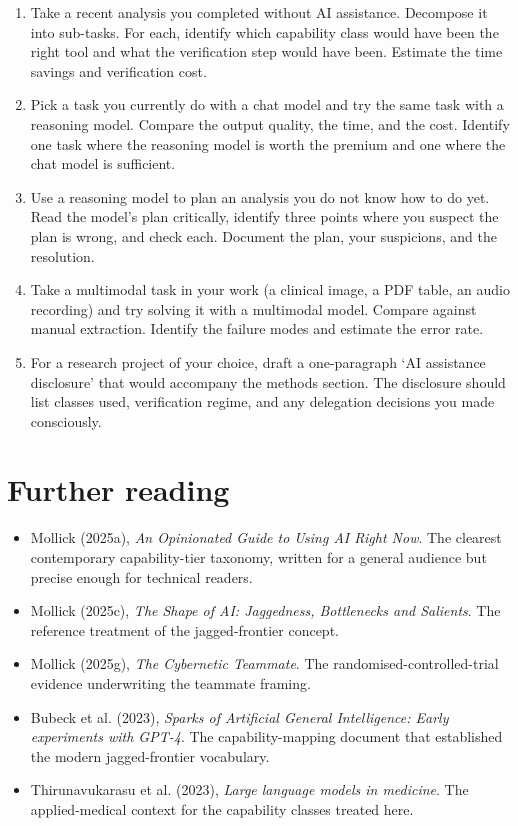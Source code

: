 \documentclass[
  letterpaper,
  11pt]{scrbook}
\providecommand{\tightlist}{%
  \setlength{\itemsep}{0pt}\setlength{\parskip}{0pt}}
\begin{document}
\begin{enumerate}
\def\labelenumi{\arabic{enumi}.}
\item
  Take a recent analysis you completed without AI assistance. Decompose
  it into sub-tasks. For each, identify which capability class would
  have been the right tool and what the verification step would have
  been. Estimate the time savings and verification cost.
\item
  Pick a task you currently do with a chat model and try the same task
  with a reasoning model. Compare the output quality, the time, and the
  cost. Identify one task where the reasoning model is worth the premium
  and one where the chat model is sufficient.
\item
  Use a reasoning model to plan an analysis you do not know how to do
  yet. Read the model's plan critically, identify three points where you
  suspect the plan is wrong, and check each. Document the plan, your
  suspicions, and the resolution.
\item
  Take a multimodal task in your work (a clinical image, a PDF table, an
  audio recording) and try solving it with a multimodal model. Compare
  against manual extraction. Identify the failure modes and estimate the
  error rate.
\item
  For a research project of your choice, draft a one-paragraph `AI
  assistance disclosure' that would accompany the methods section. The
  disclosure should list classes used, verification regime, and any
  delegation decisions you made consciously.
\end{enumerate}

\section{Further reading}\label{further-reading-1}

\begin{itemize}
\tightlist
\item
  Mollick (2025a), \emph{An Opinionated Guide to Using AI Right Now}.
  The clearest contemporary capability-tier taxonomy, written for a
  general audience but precise enough for technical readers.
\item
  Mollick (2025c), \emph{The Shape of AI: Jaggedness, Bottlenecks and
  Salients}. The reference treatment of the jagged-frontier concept.
\item
  Mollick (2025g), \emph{The Cybernetic Teammate}. The
  randomised-controlled-trial evidence underwriting the teammate
  framing.
\item
  {Bubeck et al.} (2023), \emph{Sparks of Artificial General
  Intelligence: Early experiments with GPT-4}. The capability-mapping
  document that established the modern jagged-frontier vocabulary.
\item
  Thirunavukarasu et al. (2023), \emph{Large language models in
  medicine}. The applied-medical context for the capability classes
  treated here.
\end{itemize}
\end{document}
